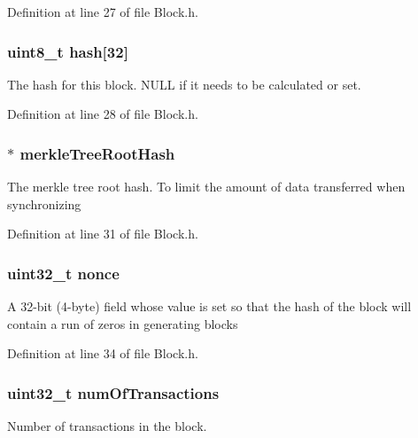 Definition at line 27 of file Block.h.

\hypertarget{struct_block_a7ff9da008bf055da1f1ba994c562057d}{
\subsubsection[{hash}]{\setlength{\rightskip}{0pt plus 5cm}uint8\_\-t {\bf hash}\mbox{[}32\mbox{]}}}
\label{struct_block_a7ff9da008bf055da1f1ba994c562057d}
The hash for this block. NULL if it needs to be calculated or set. 

Definition at line 28 of file Block.h.

\hypertarget{struct_block_a51d24d9b04212dc52192636948a05a4c}{
\subsubsection[{merkleTreeRootHash}]{$\ast$ {\bf merkleTreeRootHash}}}
\label{struct_block_a51d24d9b04212dc52192636948a05a4c}
The merkle tree root hash. To limit the amount of data transferred when synchronizing 

Definition at line 31 of file Block.h.

\hypertarget{struct_block_aa2f9785a9d9116cc4592db06375cb887}{
\subsubsection[{nonce}]{\setlength{\rightskip}{0pt plus 5cm}uint32\_\-t {\bf nonce}}}
\label{struct_block_aa2f9785a9d9116cc4592db06375cb887}
A 32-\/bit (4-\/byte) field whose value is set so that the hash of the block will contain a run of zeros in generating blocks 

Definition at line 34 of file Block.h.

\hypertarget{struct_block_ac9749ca92207f8d50ecc2b0f904e2424}{
\subsubsection[{numOfTransactions}]{\setlength{\rightskip}{0pt plus 5cm}uint32\_\-t {\bf numOfTransactions}}}
\label{struct_block_ac9749ca92207f8d50ecc2b0f904e2424}
Number of transactions in the block. 

